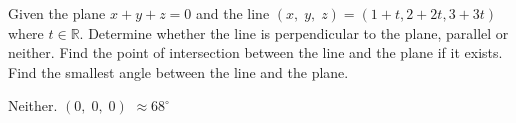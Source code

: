 
\begin{Exercise}[
name={},
title={}, 
difficulty=0,
origin={\cite{YL}}]
Given the plane $x+y+z=0$ and the line $(x,\;y,\;z)=(1+t,2+2t,3+3t)$ where $t\in\mathbb{R}$.
\Question Determine whether the line is perpendicular to the plane, parallel or neither.
\Question Find the point of intersection between the line and the plane if it exists.
\Question Find the smallest angle between the line and the plane.
\end{Exercise}

\begin{Answer}
\begin{multicols}{3}
\Question Neither.
\Question $(0,\;0,\;0)$
\Question $\approx 68^{\circ}$
\EndCurrentQuestion
\end{multicols}
\end{Answer}
